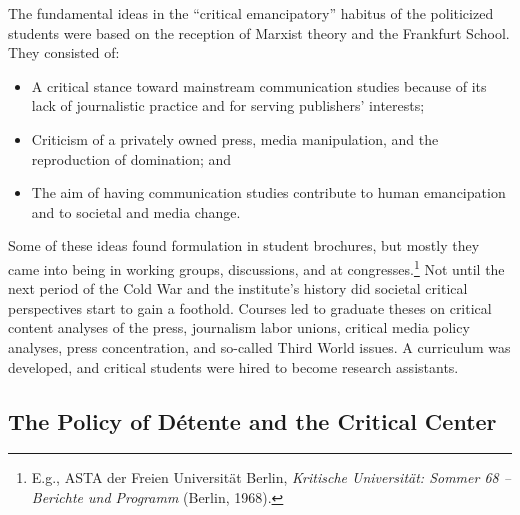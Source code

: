 \documentclass{tufte-handout}
\begin{document}
The fundamental ideas in the ``critical emancipatory'' habitus of the
politicized students were based on the reception of Marxist theory and
the Frankfurt School. They consisted of:
\begin{itemize}
\item
  A critical stance toward mainstream communication studies because of
  its lack of journalistic practice and for serving publishers'
  interests;
\newpage
\item
  Criticism of a privately owned press, media manipulation, and the
  reproduction of domination; and
\item
  The aim of having communication studies contribute to human
  emancipation and to societal and media change.
\end{itemize}

Some of these ideas found formulation in student brochures, but mostly
they came into being in working groups, discussions, and at
congresses.\footnote{E.g., ASTA der Freien Universität Berlin,
  \emph{Kritische Universität: Sommer 68 -- Berichte und Programm}
  (Berlin, 1968).} Not until the next period of the Cold War and the
institute's history did societal critical perspectives start to gain a
foothold. Courses led to graduate theses on critical content analyses of
the press, journalism labor unions, critical media policy analyses,
press concentration, and so-called Third World issues. A curriculum was
developed, and critical students were hired to become research
assistants.

\hypertarget{the-policy-of-dtente-and-the-critical-center}{%
\subsection{The Policy of Détente and the
Critical
Center}\label{the-policy-of-dtente-and-the-critical-center}}
\end{document}
